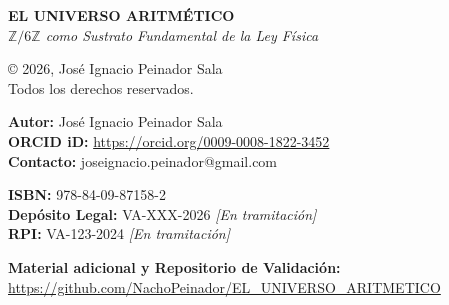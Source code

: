 \documentclass[12pt]{article}
\begin{document}
\thispagestyle{empty} %
\mbox{}               %
\clearpage            %

\thispagestyle{empty} %
\noindent
\vspace*{\fill} 

\begin{small}
\noindent \textbf{EL UNIVERSO ARITMÉTICO} \\
\textit{$\mathbb{Z}/6\mathbb{Z}$ como Sustrato Fundamental de la Ley Física}

\vspace{0.6cm}

\noindent \copyright{} 2026, José Ignacio Peinador Sala \\
\noindent Todos los derechos reservados.

\vspace{0.6cm}

\noindent \textbf{Autor:} José Ignacio Peinador Sala \\
\noindent \textbf{ORCID iD:} \url{https://orcid.org/0009-0008-1822-3452} \\
\noindent \textbf{Contacto:} joseignacio.peinador@gmail.com

\vspace{1cm}

\noindent \textbf{ISBN:} 978-84-09-87158-2 \\
\noindent \textbf{Depósito Legal:} VA-XXX-2026 \textit{[En tramitación]} \\
\noindent \textbf{RPI:} VA-123-2024 \textit{[En tramitación]}

\vspace{0.4cm}
\noindent \textbf{Material adicional y Repositorio de Validación:}\\ 
\url{https://github.com/NachoPeinador/EL_UNIVERSO_ARITMETICO}

\vspace{0.2cm}
\noindent {}


\end{small}
\end{document}
